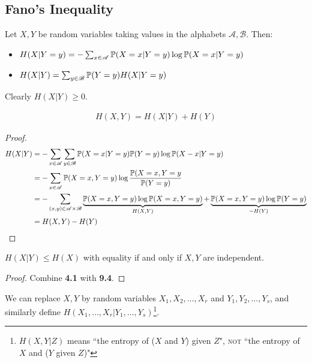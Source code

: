 \documentclass[10pt,a4paper]{article}
\begin{document}
\subsection{Fano's Inequality}
Let $X,Y$ be random variables taking values in the alphabets $\mathscr{A}, \mathscr{B}$. Then:
\begin{itemize}
\item $H(X|Y=y) = -\sum_{x \in \mathscr{A}} \P(X=x|Y=y)\log \P(X=x|Y=y)$
\item $H(X|Y) = \sum_{y \in \mathscr{B}} \P(Y=y)H(X|Y=y)$
\end{itemize}
Clearly $H(X|Y) \geq 0$.
\begin{lemma}
\begin{align*}
H(X,Y) = H(X|Y) + H(Y)
\end{align*}
\end{lemma}
\begin{proof}
\begin{align*}
H(X|Y) &= -\sum_{x\in\mathscr{A}} \sum_{y \in \mathscr{B}} \P(X=x|Y=y)\P(Y=y)\log \P(X-x|Y=y)\\
&= -\sum_{x\in\mathscr{A}} \P(X=x, Y=y) \log \frac{\P(X=x, Y=y}{\P(Y=y)}\\
&= -\sum_{(x,y)\in\mathscr{A}\times\mathscr{B}}\underbrace{\P(X=x,Y=y)\log\P(X=x,Y=y)}_{H(X,Y)} + \underbrace{\P(X=x, Y=y)\log\P(Y=y)}_{-H(Y)}\\
&= H(X,Y) - H(Y)
\end{align*}
\end{proof}
\begin{corollary}
$H(X|Y) \leq H(X)$ with equality if and only if $X,Y$ are independent.
\end{corollary}
\begin{proof}
Combine \textbf{4.1} with \textbf{9.4}.
\end{proof}
We can replace $X,Y$ by random variables $X_1, X_2, \ldots, X_r$ and $Y_1, Y_2, \ldots, Y_s$, and similarly define $H(X_1, \ldots, X_r|Y_1, \ldots, Y_s)$\footnote{$H(X,Y|Z)$ means ``the entropy of ($X$ and $Y$) given $Z$", \textsc{not} ``the entropy of $X$ and ($Y$ given $Z$)"}.
\end{document}
